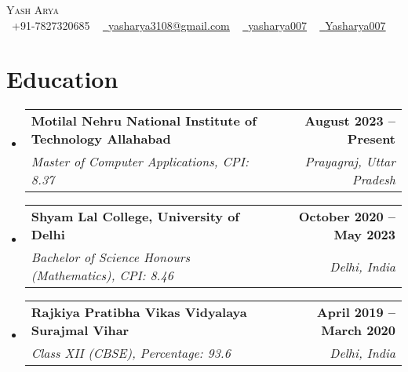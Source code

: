 \documentclass[letterpaper,11pt]{article}
\makeatletter
\newcommand{\resumeSubheading}[4]{
  \vspace{-2pt}\item
    \begin{tabular*}{1.0\textwidth}[t]{l@{\extracolsep{\fill}}r}
      \textbf{#1} & \textbf{\small #2} \\
      \textit{\small#3} & \textit{\small #4} \\
    \end{tabular*}\vspace{-7pt}
}
\newcommand{\resumeSubHeadingListStart}{\begin{itemize}[leftmargin=0.0in, label={}]}
\newcommand{\resumeSubHeadingListEnd}{\end{itemize}}
\makeatother
\begin{document}

\begin{center}
    {\Huge \scshape Yash Arya}\\ \vspace{4pt}
    \small \raisebox{-0.1\height}\faPhone\ +91-7827320685 ~ \href{mailto:yasharya3108@gmail.com}{\raisebox{-0.2\height}\faEnvelope\  \underline{yasharya3108@gmail.com}} ~ 
    \href{https://www.linkedin.com/in/yasharya007/}{\raisebox{-0.2\height}\faLinkedin\ \underline{yasharya007}}  ~
    \href{https://github.com/Yasharya007}{\raisebox{-0.2\height}\faGithub\ \underline{Yasharya007}}
    \vspace{-8pt}
\end{center}


\section{Education}
  \resumeSubHeadingListStart
    \resumeSubheading
      {Motilal Nehru National Institute of Technology Allahabad}{August 2023 -- Present}
      {Master of Computer Applications, CPI: 8.37}{Prayagraj, Uttar Pradesh}
  \resumeSubheading
      {Shyam Lal College, University of Delhi}{October 2020 -- May 2023}
      {Bachelor of Science Honours (Mathematics), CPI: 8.46}{Delhi, India}
  \resumeSubheading
      {Rajkiya Pratibha Vikas Vidyalaya Surajmal Vihar}{April 2019 -- March 2020}
      {Class XII (CBSE),  Percentage: 93.6}{Delhi, India}
  \resumeSubHeadingListEnd




\end{document}
